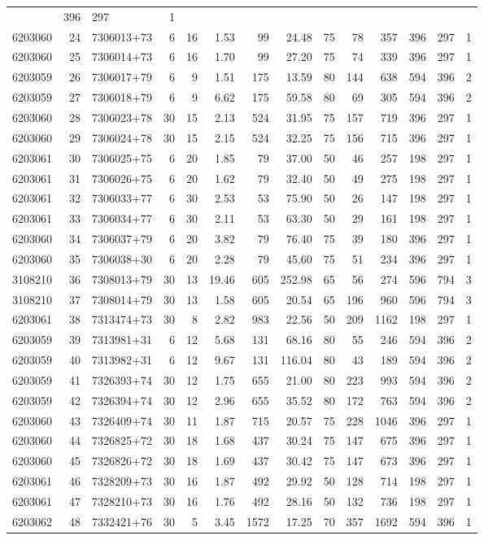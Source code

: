 \documentclass[
]{article}
\begin{document}
\begin{longtable}[]{@{}rrlrrrrrrrrrrr@{}}
& 396 & 297 & 1\tabularnewline
6203060 & 24 & 7306013+73 & 6 & 16 & 1.53 & 99 & 24.48 & 75 & 78 & 357 &
396 & 297 & 1\tabularnewline
6203060 & 25 & 7306014+73 & 6 & 16 & 1.70 & 99 & 27.20 & 75 & 74 & 339 &
396 & 297 & 1\tabularnewline
6203059 & 26 & 7306017+79 & 6 & 9 & 1.51 & 175 & 13.59 & 80 & 144 & 638
& 594 & 396 & 2\tabularnewline
6203059 & 27 & 7306018+79 & 6 & 9 & 6.62 & 175 & 59.58 & 80 & 69 & 305 &
594 & 396 & 2\tabularnewline
6203060 & 28 & 7306023+78 & 30 & 15 & 2.13 & 524 & 31.95 & 75 & 157 &
719 & 396 & 297 & 1\tabularnewline
6203060 & 29 & 7306024+78 & 30 & 15 & 2.15 & 524 & 32.25 & 75 & 156 &
715 & 396 & 297 & 1\tabularnewline
6203061 & 30 & 7306025+75 & 6 & 20 & 1.85 & 79 & 37.00 & 50 & 46 & 257 &
198 & 297 & 1\tabularnewline
6203061 & 31 & 7306026+75 & 6 & 20 & 1.62 & 79 & 32.40 & 50 & 49 & 275 &
198 & 297 & 1\tabularnewline
6203061 & 32 & 7306033+77 & 6 & 30 & 2.53 & 53 & 75.90 & 50 & 26 & 147 &
198 & 297 & 1\tabularnewline
6203061 & 33 & 7306034+77 & 6 & 30 & 2.11 & 53 & 63.30 & 50 & 29 & 161 &
198 & 297 & 1\tabularnewline
6203060 & 34 & 7306037+79 & 6 & 20 & 3.82 & 79 & 76.40 & 75 & 39 & 180 &
396 & 297 & 1\tabularnewline
6203060 & 35 & 7306038+30 & 6 & 20 & 2.28 & 79 & 45.60 & 75 & 51 & 234 &
396 & 297 & 1\tabularnewline
3108210 & 36 & 7308013+79 & 30 & 13 & 19.46 & 605 & 252.98 & 65 & 56 &
274 & 596 & 794 & 3\tabularnewline
3108210 & 37 & 7308014+79 & 30 & 13 & 1.58 & 605 & 20.54 & 65 & 196 &
960 & 596 & 794 & 3\tabularnewline
6203061 & 38 & 7313474+73 & 30 & 8 & 2.82 & 983 & 22.56 & 50 & 209 &
1162 & 198 & 297 & 1\tabularnewline
6203059 & 39 & 7313981+31 & 6 & 12 & 5.68 & 131 & 68.16 & 80 & 55 & 246
& 594 & 396 & 2\tabularnewline
6203059 & 40 & 7313982+31 & 6 & 12 & 9.67 & 131 & 116.04 & 80 & 43 & 189
& 594 & 396 & 2\tabularnewline
6203059 & 41 & 7326393+74 & 30 & 12 & 1.75 & 655 & 21.00 & 80 & 223 &
993 & 594 & 396 & 2\tabularnewline
6203059 & 42 & 7326394+74 & 30 & 12 & 2.96 & 655 & 35.52 & 80 & 172 &
763 & 594 & 396 & 2\tabularnewline
6203060 & 43 & 7326409+74 & 30 & 11 & 1.87 & 715 & 20.57 & 75 & 228 &
1046 & 396 & 297 & 1\tabularnewline
6203060 & 44 & 7326825+72 & 30 & 18 & 1.68 & 437 & 30.24 & 75 & 147 &
675 & 396 & 297 & 1\tabularnewline
6203060 & 45 & 7326826+72 & 30 & 18 & 1.69 & 437 & 30.42 & 75 & 147 &
673 & 396 & 297 & 1\tabularnewline
6203061 & 46 & 7328209+73 & 30 & 16 & 1.87 & 492 & 29.92 & 50 & 128 &
714 & 198 & 297 & 1\tabularnewline
6203061 & 47 & 7328210+73 & 30 & 16 & 1.76 & 492 & 28.16 & 50 & 132 &
736 & 198 & 297 & 1\tabularnewline
6203062 & 48 & 7332421+76 & 30 & 5 & 3.45 & 1572 & 17.25 & 70 & 357 &
1692 & 594 & 396 & 1\tabularnewline

\end{longtable}
\end{document}
